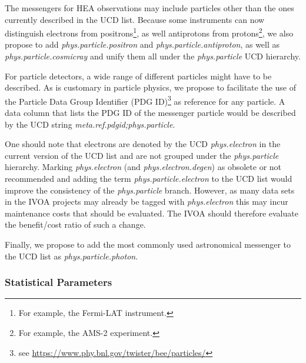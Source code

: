 \documentclass[11pt,a4paper]{ivoa}
\begin{document}
The messengers for \gls{HEA} observations may include particles other than the ones currently described in the UCD list.  Because some instruments can now distinguish electrons from positrons\footnote{For example, the Fermi-LAT instrument.}, as well antiprotons from protons\footnote{For example, the AMS-2 experiment.}, we also propose to add {\em phys.particle.positron\/} and {\em phys.particle.antiproton\/}, as well as {\em phys.particle.cosmicray\/} and unify them all under the {\em phys.particle\/} UCD hierarchy.

For particle detectors, a wide range of different particles might have to be described. As is customary in particle physics, we propose to facilitate the use of the Particle Data Group Identifier (PDG ID)\footnote{see \url{https://www.phy.bnl.gov/twister/bee/particles/}} as reference for any particle.  A data column that lists the PDG ID of the messenger particle would be described by the UCD string {\em meta.ref.pdgid;phys.particle\/}.

One should note that electrons are denoted by the UCD {\em phys.electron\/} in the current version of the UCD list \citep{2024ivoa.spec.1218C} and are not grouped under the {\em phys.particle\/} hierarchy.
Marking {\em phys.electron\/} (and {\em phys.electron.degen\/}) as obsolete or not recommended and adding the term  {\em phys.particle.electron\/} to the UCD list would improve the consistency of the {\em phys.particle\/} branch.
However, as many data sets in the IVOA projects may already be tagged with {\em phys.electron\/} this may incur maintenance costs that should be evaluated. 
The IVOA should therefore evaluate the benefit/cost ratio of such a change. 

Finally, we propose to add the most commonly used astronomical messenger to the UCD list as {\em phys.particle.photon\/}.

\subsubsection{Statistical Parameters}
\end{document}
